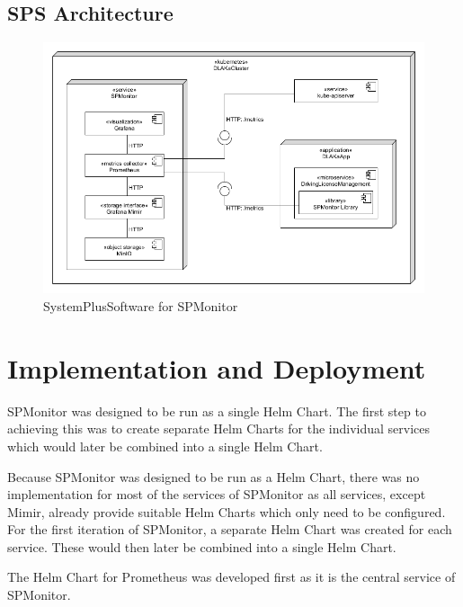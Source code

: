 \subsection{SPS Architecture}


\begin{figure}[h]
	\centering
	\includegraphics[width=\textwidth]{figures/sps_spmonitor.png}
	\caption{SystemPlusSoftware for SPMonitor}
	\label{fig:sps_spmonitor}
\end{figure}

\section{Implementation and Deployment}
\label{sec:impl_and_deployment}



SPMonitor was designed to be run as a single Helm Chart.
The first step to achieving this was to create separate Helm Charts for the individual
services which would later be combined into a single Helm Chart.

Because SPMonitor was designed to be run as a Helm Chart,
there was no implementation for most of the services of SPMonitor
as all services, except Mimir, already provide suitable Helm Charts which only
need to be configured. For the first iteration of SPMonitor, a separate Helm Chart
was created for each service. These would then later be combined into a single
Helm Chart.

The Helm Chart for Prometheus was developed first as it is the central service of SPMonitor.

\cite{PRO-HELM}

\cite{GRA-HELM}

\cite{MIM-IMG}

\cite{MIN-HELM}